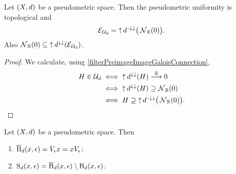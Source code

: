\begin{lemma} \label{pseudometricUniformityTopological}
Let $\left( X,d \right)$ be a pseudometric space. Then the pseudometric uniformity is topological and
\[ \operatorname{\mathcal{E}}_{\mathcal{U}_d} = \operatorname{\uparrow} d^{{\text{\hspace{0.15em}-}\downarrow}\downarrow}\big(\operatorname{\mathcal{N}}_{\mathbb{R}}(0)\big). \]
Also $\operatorname{\mathcal{N}}_{\mathbb{R}}(0) \subseteq \operatorname{\uparrow} d^{\downarrow\downarrow}(\operatorname{\mathcal{E}}_{\mathcal{U}_d})$.
\end{lemma}
\begin{proof}
We calculate, using \ref{filterPreimageImageGaloisConnection},
\begin{align*}
H \in \mathcal{U}_d &\iff \operatorname{\uparrow} d^{\downarrow\downarrow}(H)\overset{\mathbb{R}}{\longrightarrow} 0 \\
&\iff \operatorname{\uparrow} d^{\downarrow\downarrow}(H)\supseteq \operatorname{\mathcal{N}}_{\mathbb{R}}(0) \\
&\iff H \supseteq \operatorname{\uparrow} d^{{\text{\hspace{0.15em}-}\downarrow}\downarrow}\big(\operatorname{\mathcal{N}}_{\mathbb{R}}(0)\big).
\end{align*}
\end{proof}

\begin{lemma}
Let $\left( X,d \right)$ be a pseudometric space. Then
\begin{enumerate}
\item $\operatorname{\overline{B}}_d(x,\epsilon) = V_\epsilon x = xV_\epsilon$;
\item $\operatorname{S}_d(x,\epsilon) = \operatorname{\overline{B}}_d(x,\epsilon)\setminus \operatorname{B}_d(x,\epsilon)$.
\end{enumerate}
\end{lemma}

